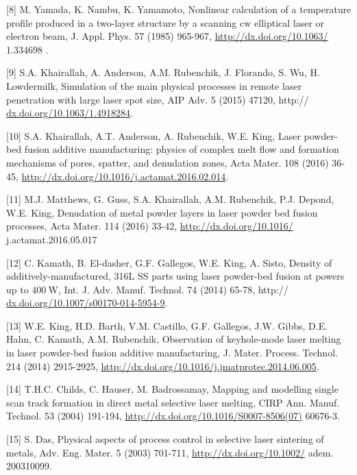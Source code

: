 \documentclass[10pt]{article}
\begin{document}
[8] M. Yamada, K. Nambu, K. Yamamoto, Nonlinear calculation of a temperature profile produced in a two-layer structure by a scanning $\mathrm{cw}$ elliptical laser or electron beam, J. Appl. Phys. 57 (1985) 965-967, \href{http://dx.doi.org/10.1063/}{http://dx.doi.org/10.1063/} 1.334698 .

[9] S.A. Khairallah, A. Anderson, A.M. Rubenchik, J. Florando, S. Wu, H. Lowdermilk, Simulation of the main physical processes in remote laser penetration with large laser spot size, AIP Adv. 5 (2015) 47120, http:// \href{http://dx.doi.org/10.1063/1.4918284}{dx.doi.org/10.1063/1.4918284}.

[10] S.A. Khairallah, A.T. Anderson, A. Rubenchik, W.E. King, Laser powder-bed fusion additive manufacturing: physics of complex melt flow and formation mechanisms of pores, spatter, and denudation zones, Acta Mater. 108 (2016) 36-45, \href{http://dx.doi.org/10.1016/j.actamat.2016.02.014}{http://dx.doi.org/10.1016/j.actamat.2016.02.014}.

[11] M.J. Matthews, G. Guss, S.A. Khairallah, A.M. Rubenchik, P.J. Depond, W.E. King, Denudation of metal powder layers in laser powder bed fusion processes, Acta Mater. 114 (2016) 33-42, \href{http://dx.doi.org/10.1016/}{http://dx.doi.org/10.1016/} j.actamat.2016.05.017

[12] C. Kamath, B. El-dasher, G.F. Gallegos, W.E. King, A. Sisto, Density of additively-manufactured, 316L SS parts using laser powder-bed fusion at powers up to $400 \mathrm{~W}$, Int. J. Adv. Manuf. Technol. 74 (2014) 65-78, http:// \href{http://dx.doi.org/10.1007/s00170-014-5954-9}{dx.doi.org/10.1007/s00170-014-5954-9}.

[13] W.E. King, H.D. Barth, V.M. Castillo, G.F. Gallegos, J.W. Gibbs, D.E. Hahn, C. Kamath, A.M. Rubenchik, Observation of keyhole-mode laser melting in laser powder-bed fusion additive manufacturing, J. Mater. Process. Technol. 214 (2014) 2915-2925, \href{http://dx.doi.org/10.1016/j.jmatprotec.2014.06.005}{http://dx.doi.org/10.1016/j.jmatprotec.2014.06.005}.

[14] T.H.C. Childs, C. Hauser, M. Badrossamay, Mapping and modelling single scan track formation in direct metal selective laser melting, CIRP Ann. Manuf. Technol. 53 (2004) 191-194, \href{http://dx.doi.org/10.1016/S0007-8506(07)}{http://dx.doi.org/10.1016/S0007-8506(07)} 60676-3.

[15] S. Das, Physical aspects of process control in selective laser sintering of metals, Adv. Eng. Mater. 5 (2003) 701-711, \href{http://dx.doi.org/10.1002/}{http://dx.doi.org/10.1002/} adem. 200310099.
\end{document}
